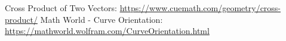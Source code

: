 \documentclass [12pt]{article}
\newtheorem{theorem}{Theorem}[section]
\begin{document}





\begin{thebibliography}{1}
Cross Product of Two Vectors: \url{https://www.cuemath.com/geometry/cross-product/}
Math World - Curve Orientation: \url{https://mathworld.wolfram.com/CurveOrientation.html}
\end{thebibliography}
\end{document}
